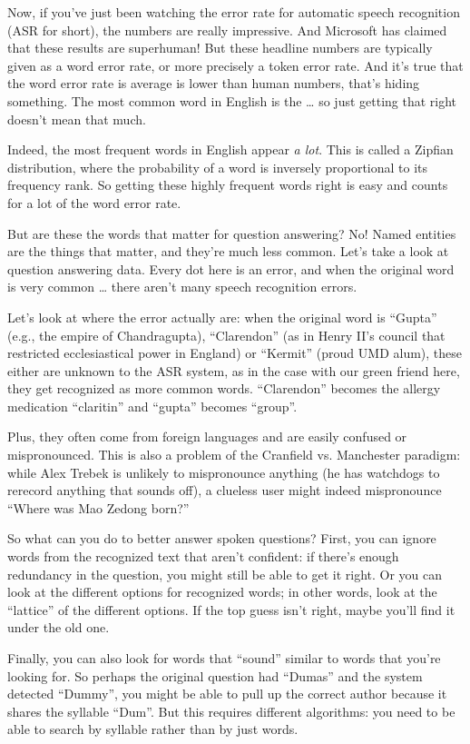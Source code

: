 Now, if you’ve just been watching the error rate for automatic speech recognition (ASR for short), the numbers are really impressive.  And Microsoft has claimed that these results are superhuman!  But these headline numbers are typically given as a word error rate, or more precisely a token error rate.  And it’s true that the word error rate is average is lower than human numbers, that’s hiding something.  The most common word in English is the … so just getting that right doesn’t mean that much.

Indeed, the most frequent words in English appear \emph{a lot}.  This is called a Zipfian distribution, where the probability of a word is inversely proportional to its frequency rank.  So getting these highly frequent words right is easy and counts for a lot of the word error rate.

But are these the words that matter for question answering?  No!  Named entities are the things that matter, and they’re much less common.  Let’s take a look at question answering data.  Every dot here is an error, and when the original word is very common … there aren’t many speech recognition errors.

Let’s look at where the error actually are: when the original word is “Gupta” (e.g., the empire of Chandragupta), “Clarendon” (as in Henry II’s council that restricted ecclesiastical power in England) or “Kermit” (proud UMD alum), these either are unknown to the ASR system, as in the case with our green friend here, they get recognized as more common words.  “Clarendon” becomes the allergy medication “claritin” and “gupta” becomes “group”.  

Plus, they often come from foreign languages and are easily confused or mispronounced.  This is also a problem of the Cranfield vs. Manchester paradigm: while Alex Trebek is unlikely to mispronounce anything (he has watchdogs to rerecord anything that sounds off), a clueless user might indeed mispronounce “Where was Mao Zedong born?”

So what can you do to better answer spoken questions?  First, you can ignore words from the recognized text that aren’t confident: if there’s enough redundancy in the question, you might still be able to get it right.  Or you can look at the different options for recognized words; in other words, look at the “lattice” of the different options.  If the top guess isn’t right, maybe you’ll find it under the old one.

Finally, you can also look for words that “sound” similar to words that you’re looking for.  So perhaps the original question had “Dumas” and the system detected “Dummy”, you might be able to pull up the correct author because it shares the syllable “Dum”.  But this requires different algorithms: you need to be able to search by syllable rather than by just words.

